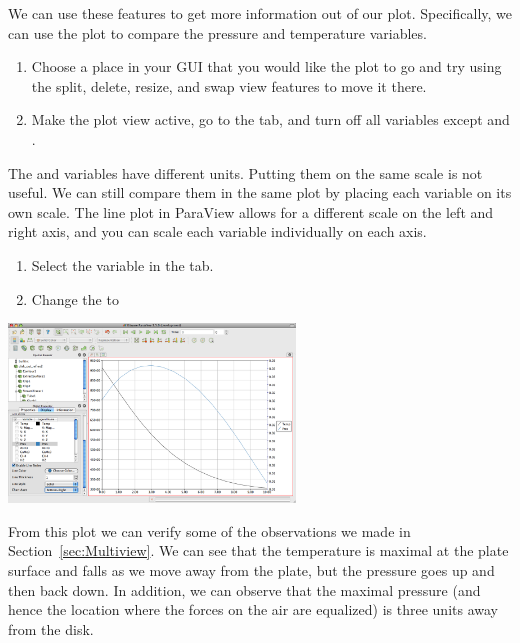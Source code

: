 We can use these features to get more information out of our plot.
Specifically, we can use the plot to compare the pressure and temperature
variables.

\begin{enumerate}
\item Choose a place in your GUI that you would like the plot to go and try
  using the split, delete, resize, and swap view features to move it there.
\item Make the plot view active, go to the  tab, and turn off
  all variables except  and .
  \savecounter
\end{enumerate}

The  and  variables have different units.  Putting them
on the same scale is not useful.  We can still compare them in the same
plot by placing each variable on its own scale.  The line plot in ParaView
allows for a different scale on the left and right axis, and you can scale
each variable individually on each axis.

\begin{enumerate}
  \restorecounter
\item Select the  variable in the  tab.
\item Change the  to 
\end{enumerate}

\begin{inlinefig}
  \includegraphics[width=3in]{images/LinePlot3}
\end{inlinefig}

From this plot we can verify some of the observations we made in
Section~\ref{sec:Multiview}.  We can see that the temperature is maximal at
the plate surface and falls as we move away from the plate, but the
pressure goes up and then back down.  In addition, we can observe that the
maximal pressure (and hence the location where the forces on the air are
equalized) is three units away from the disk.

